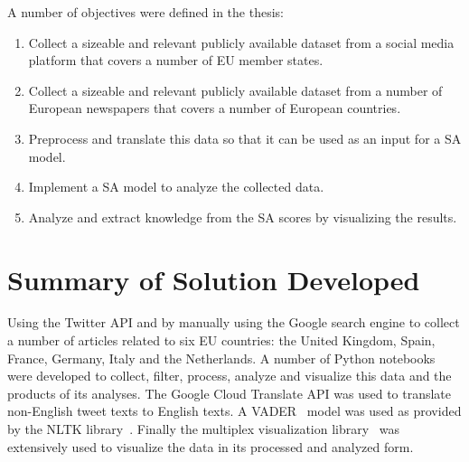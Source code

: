 \noindent A number of objectives were defined in the thesis:

\begin{enumerate}
  \item Collect a sizeable and relevant publicly available dataset from a social media platform that covers a number of \ac{EU} member states.
  \item Collect a sizeable and relevant publicly available dataset from a number of European newspapers that covers a number of European countries.
  \item Preprocess and translate this data so that it can be used as an input for a \ac{SA} model.
  \item Implement a \ac{SA} model to analyze the collected data.
  \item Analyze and extract knowledge from the \ac{SA} scores by visualizing the results.
\end{enumerate}

\section{Summary of Solution Developed}

Using the Twitter \ac{API} and by manually using the Google search engine to collect a number of articles related to six \ac{EU} countries: the United Kingdom, Spain, France, Germany, Italy and the Netherlands.
A number of Python notebooks were developed to collect, filter, process, analyze and visualize this data and the products of its analyses.
The Google Cloud Translate \ac{API} was used to translate non-English tweet texts to English texts.
A \ac{VADER}~\citep{Hutto_Gilbert_2014} model was used as provided by the \ac{NLTK} library~\citep{bird2009natural}.
Finally the multiplex visualization library~\citep{Mamo2021} was extensively used to visualize the data in its processed and analyzed form.


%

